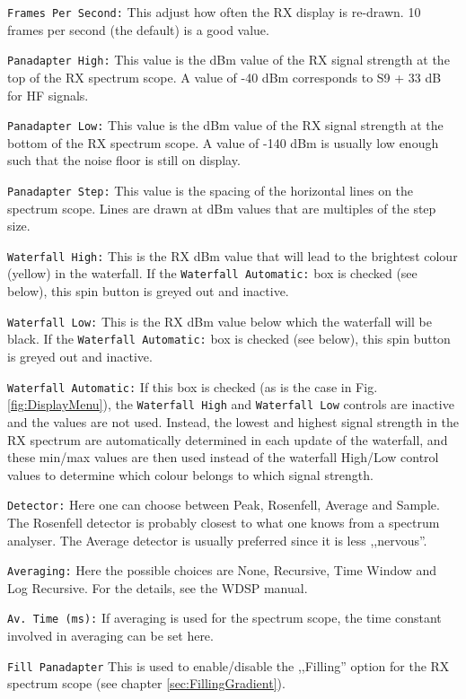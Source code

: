 \documentclass[12pt]{book}
\def\rett#1{\texttt{\color{red}#1}}
\begin{document}
\rett{Frames Per Second:} This adjust how often the RX display is re-drawn.
10 frames per second (the default) is a good value.

\rett{Panadapter High:} This value is the dBm value of the RX signal strength at the
top of the RX spectrum scope. A value of -40 dBm corresponds to S9 + 33 dB for HF
signals.

\rett{Panadapter Low:} This value is the dBm value of the RX signal strength at the
bottom of the RX spectrum scope. A value of -140 dBm is usually low enough such that
the noise floor is still on display.

\rett{Panadapter Step:} This value is the spacing of the horizontal lines on
the spectrum scope. Lines are drawn at dBm values that are multiples of the step
size.

\rett{Waterfall High:} This is the RX dBm value that will lead to the brightest
colour (yellow) in the waterfall. If the \rett{Waterfall Automatic:} box is checked
(see below), this spin button is greyed out and inactive.

\rett{Waterfall Low:} This is the RX dBm value below which the waterfall will be black.
If the \rett{Waterfall Automatic:} box is checked
(see below), this spin button is greyed out and inactive.

\rett{Waterfall Automatic:} If this box is checked (as is the case in
Fig. \ref{fig:DisplayMenu}), the \rett{Waterfall High} and
\rett{Waterfall Low} controls are inactive and the values are not used. Instead,
the lowest and highest signal strength in the RX spectrum are automatically determined
in each update of the waterfall, and these min/max values
are then used instead of the waterfall High/Low control values to determine which
colour belongs to which signal strength.

\rett{Detector:} Here one can choose between Peak, Rosenfell, Average and Sample. The
Rosenfell detector is probably closest to what one knows from a spectrum analyser.
The Average detector is usually preferred since it is less ,,nervous''.

\rett{Averaging:} Here the possible choices are None, Recursive, Time Window and
Log Recursive. For the details, see the WDSP manual.

\rett{Av. Time (ms):} If averaging is used for the spectrum scope, the time
constant involved in averaging can be set here.

\rett{Fill Panadapter} This is used to enable/disable the ,,Filling'' option
for the RX  spectrum scope (see chapter \ref{sec:FillingGradient}).
\end{document}
